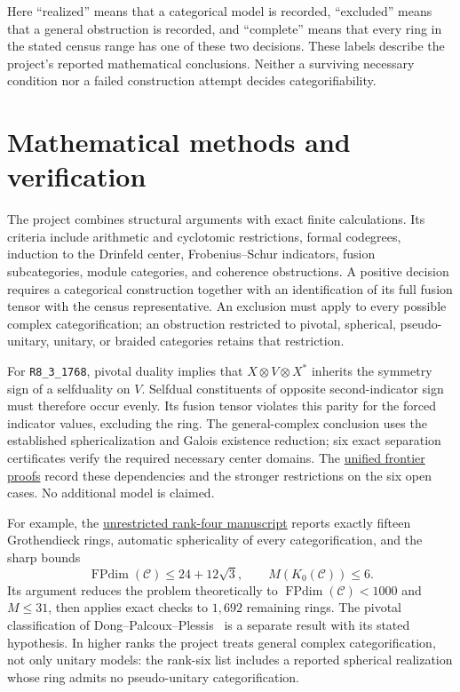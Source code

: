 \documentclass[11pt,a4paper]{article}
\newcommand{\FPdim}{\operatorname{FPdim}}
\newcommand{\classcommit}{d920cc2531d8b03583c797886a3c2ab6170a281a}
\newcommand{\classrepo}{https://github.com/sebastienpalcoux/grothendieck-ring-classification}
\newcommand{\prooflink}[2]{\href{\classrepo/blob/\classcommit/#1}{#2}}
\begin{document}
Here ``realized'' means that a categorical model is recorded, ``excluded''
means that a general obstruction is recorded, and ``complete'' means that
every ring in the stated census range has one of these two decisions.
These labels describe the project's reported mathematical conclusions.
Neither a surviving necessary condition nor a failed construction attempt
decides categorifiability.

\section{Mathematical methods and verification}
The project combines structural arguments with exact finite calculations.
Its criteria include arithmetic and cyclotomic restrictions, formal
codegrees, induction to the Drinfeld center, Frobenius--Schur indicators,
fusion subcategories, module categories, and coherence obstructions.
A positive decision requires a categorical construction together with
an identification of its full fusion tensor with the census representative.
An exclusion must apply to every possible complex categorification;
an obstruction restricted to pivotal, spherical, pseudo-unitary, unitary,
or braided categories retains that restriction.

For \texttt{R8\_3\_1768}, pivotal duality implies that
$X\otimes V\otimes X^*$ inherits the symmetry sign of a selfduality on
$V$. Selfdual constituents of opposite second-indicator sign must
therefore occur evenly. Its fusion tensor violates this parity for the
forced indicator values, excluding the ring. The general-complex
conclusion uses the established sphericalization and Galois existence
reduction; six exact separation certificates verify the required
necessary center domains. The
\href{\classrepo/blob/main/evidence/frontier/README.md}{unified frontier proofs}
record these dependencies and the stronger restrictions on the six open
cases. No additional model is claimed.

For example, the
\prooflink{manuscripts/rank4/papers/companion.pdf}{unrestricted rank-four manuscript}
reports exactly fifteen Grothendieck rings, automatic sphericality of every
categorification, and the sharp bounds
\[
 \FPdim(\mathcal C)\leq24+12\sqrt3,
 \qquad M(K_0(\mathcal C))\leq6.
\]
Its argument reduces the problem theoretically to
$\FPdim(\mathcal C)<1000$ and $M\leq31$, then applies exact checks to
$1{,}692$ remaining rings. The pivotal classification of
Dong--Palcoux--Plessis~\cite{DPP} is a separate result with its stated
hypothesis. In higher ranks the project treats general complex
categorification, not only unitary models: the rank-six list includes
a reported spherical realization whose ring admits no pseudo-unitary
categorification.
\end{document}
